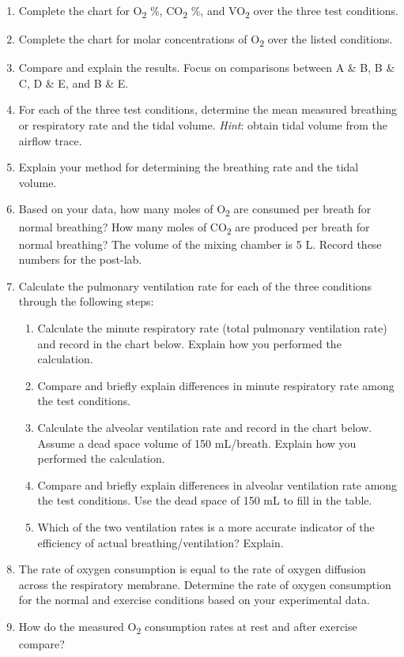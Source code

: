 \documentclass{article}
\begin{document}
\begin{enumerate}
	\item Complete the chart for O\textsubscript{2} \%, CO\textsubscript{2} \%, and VO\textsubscript{2} over the three test conditions.
	\item Complete the chart for molar concentrations of O\textsubscript{2} over the listed conditions.
	\item Compare and explain the results. Focus on comparisons between A \& B, B \& C, D \& E, and B \& E.
	\item For each of the three test conditions, determine the mean measured breathing or respiratory rate and the tidal volume. \textit{Hint}: obtain tidal volume from the airflow trace.
	\item Explain your method for determining the breathing rate and the tidal volume.
	\item Based on your data, how many moles of O\textsubscript{2} are consumed per breath for normal breathing? How many moles of CO\textsubscript{2} are produced per breath for normal breathing? The volume of the mixing chamber is 5 L. Record these numbers for the post-lab.
	\item Calculate the pulmonary ventilation rate for each of the three conditions through the following steps:\begin{enumerate}
	\item Calculate the minute respiratory rate (total pulmonary ventilation rate) and record in the chart below. Explain how you performed the calculation.
	\item Compare and briefly explain differences in minute respiratory rate among the test conditions.
	\item Calculate the alveolar ventilation rate and record in the chart below. Assume a dead space volume of 150 mL/breath. Explain how you performed the calculation.
	\item Compare and briefly explain differences in alveolar ventilation rate among the test conditions. Use the dead space of 150 mL to fill in the table.
	\item Which of the two ventilation rates is a more accurate indicator of the efficiency of actual breathing/ventilation? Explain.
	\end{enumerate}
	
	\item The rate of oxygen consumption is equal to the rate of oxygen diffusion across the respiratory membrane. Determine the rate of oxygen consumption for the normal and exercise conditions based on your experimental data.
	\item How do the measured O\textsubscript{2} consumption rates at rest and after exercise compare?
\end{enumerate}
\end{document}
